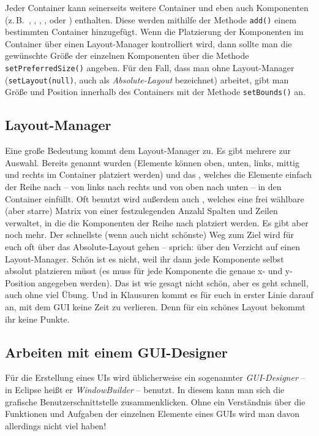 Jeder Container kann seinerseits weitere Container und eben auch Komponenten
(z.\,B.\ , , ,
,  oder ) enthalten.
Diese werden mithilfe der Methode \lstinline|add()| einem bestimmten Container
hinzugefügt. Wenn die Platzierung der Komponenten im Container über einen
Layout-Manager kontrolliert wird, dann sollte man die gewünschte Größe der
einzelnen Komponenten über die Methode \lstinline|setPreferredSize()| angeben.
Für den Fall, dass man ohne Layout-Manager (\lstinline|setLayout(null)|, auch
als \emph{Absolute-Layout} bezeichnet) arbeitet, gibt man Größe und Position
innerhalb des Containers mit der Methode \lstinline|setBounds()| an.

\subsection{Layout-Manager}

Eine große Bedeutung kommt dem Layout-Manager zu. Es gibt mehrere zur Auswahl.
Bereits genannt wurden  (Elemente können oben, unten,
links, mittig und rechts im Container platziert werden) und das
, welches die Elemente einfach der Reihe nach -- von links
nach rechts und von oben nach unten -- in den Container einfüllt. Oft benutzt
wird außerdem auch , welches eine frei wählbare (aber
starre) Matrix von einer festzulegenden Anzahl Spalten und Zeilen verwaltet, in
die die Komponenten der Reihe nach platziert werden. Es gibt aber noch mehr.
Der schnellste (wenn auch nicht schönste) Weg zum Ziel wird für euch oft über
das Absolute-Layout gehen -- sprich: über den Verzicht auf einen Layout-Manager.
Schön ist es nicht, weil ihr dann jede Komponente selbst absolut platzieren
müsst (es muss für jede Komponente die genaue x- und y-Position angegeben
werden). Das ist wie gesagt nicht schön, aber es geht schnell, auch ohne
viel Übung. Und in Klausuren kommt es für euch in erster Linie darauf an, mit
dem GUI keine Zeit zu verlieren. Denn für ein schönes Layout bekommt ihr keine
Punkte.

\subsection{Arbeiten mit einem GUI-Designer}

Für die Erstellung eines UIs wird üblicherweise ein sogenannter
\emph{GUI-Designer} -- in Eclipse heißt er \emph{WindowBuilder} -- benutzt.
In diesem kann man sich die grafische Benutzerschnittstelle \glqq
zusammenklicken\grqq . Ohne ein Verständnis über die Funktionen und Aufgaben
der einzelnen Elemente eines GUIs wird man davon allerdings nicht viel haben!

